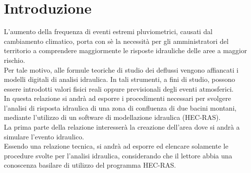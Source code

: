 \section{Introduzione}
L'aumento della frequenza di eventi estremi pluviometrici, causati dal cambiamento climatico, porta con sè la necessità per gli amministratori del territorio a comprendere maggiormente le risposte idrauliche delle aree a maggior rischio.\\
Per tale motivo, alle formule teoriche di studio dei deflussi vengono affiancati i modelli digitali di analisi idraulica. In tali strumenti, a fini di studio, possono essere introdotti valori fisici reali oppure previsionali degli eventi atmosferici.\\ 
In questa relazione si andrà ad esporre i procedimenti necessari per svolgere l'analisi di risposta idraulica di una zona di confluenza di due bacini montani, mediante l'utilizzo di un software di modellazione idraulica (HEC-RAS).\\
La prima parte della relazione interesserà la creazione dell'area dove si andrà a simulare l'evento idraulico.\\
Essendo una relazione tecnica, si andrà ad esporre ed elencare solamente le procedure svolte per l'analisi idraulica, considerando che il lettore abbia una conoscenza basilare di utilizzo del programma HEC-RAS.